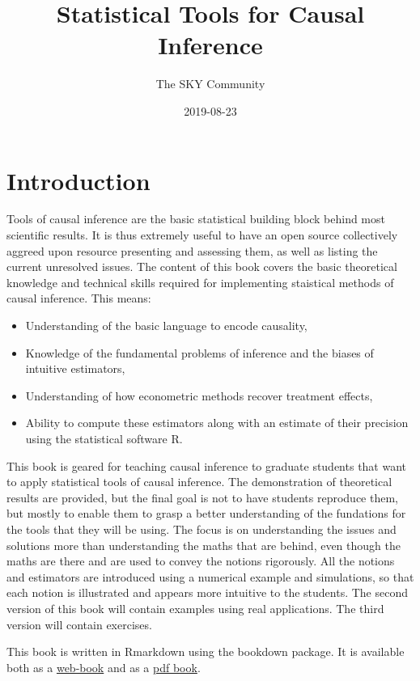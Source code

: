 \documentclass[]{book}
\title{Statistical Tools for Causal Inference}
\author{The SKY Community}
\date{2019-08-23}
\providecommand{\tightlist}{%
  \setlength{\itemsep}{0pt}\setlength{\parskip}{0pt}}
\theoremstyle{definition}
\theoremstyle{definition}
\theoremstyle{definition}
\theoremstyle{remark}
\begin{document}
\maketitle

{
\setcounter{tocdepth}{1}
\tableofcontents
}
\chapter*{Introduction}\label{introduction}

Tools of causal inference are the basic statistical building block
behind most scientific results. It is thus extremely useful to have an
open source collectively aggreed upon resource presenting and assessing
them, as well as listing the current unresolved issues. The content of
this book covers the basic theoretical knowledge and technical skills
required for implementing staistical methods of causal inference. This
means:

\begin{itemize}
\tightlist
\item
  Understanding of the basic language to encode causality,
\item
  Knowledge of the fundamental problems of inference and the biases of
  intuitive estimators,
\item
  Understanding of how econometric methods recover treatment effects,
\item
  Ability to compute these estimators along with an estimate of their
  precision using the statistical software R.
\end{itemize}

This book is geared for teaching causal inference to graduate students
that want to apply statistical tools of causal inference. The
demonstration of theoretical results are provided, but the final goal is
not to have students reproduce them, but mostly to enable them to grasp
a better understanding of the fundations for the tools that they will be
using. The focus is on understanding the issues and solutions more than
understanding the maths that are behind, even though the maths are there
and are used to convey the notions rigorously. All the notions and
estimators are introduced using a numerical example and simulations, so
that each notion is illustrated and appears more intuitive to the
students. The second version of this book will contain examples using
real applications. The third version will contain exercises.

This book is written in Rmarkdown using the bookdown package. It is
available both as a \href{https://chabefer.github.io/STCI/}{web-book}
and as a \href{https://chabefer.github.io/STCI/STCI.pdf}{pdf book}.
\end{document}
